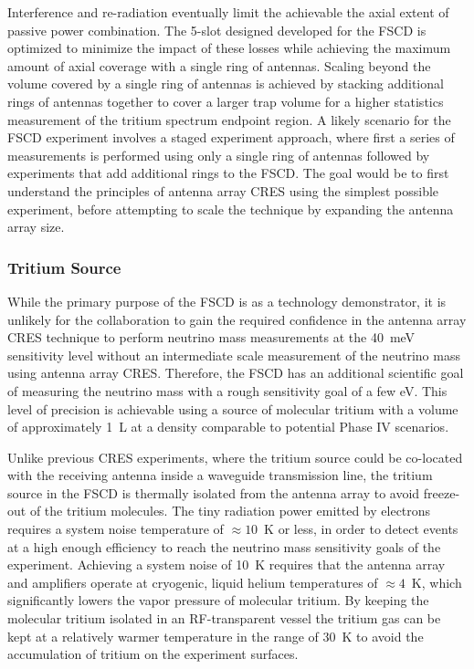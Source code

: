 Interference and re-radiation eventually limit the achievable the axial extent of passive power combination. The 5-slot designed developed for the FSCD is optimized to minimize the impact of these losses while achieving the maximum amount of axial coverage with a single ring of antennas. Scaling beyond the volume covered by a single ring of antennas is achieved by stacking additional rings of antennas together to cover a larger trap volume for a higher statistics measurement of the tritium spectrum endpoint region. A likely scenario for the FSCD experiment involves a staged experiment approach, where first a series of measurements is performed using only a single ring of antennas followed by experiments that add additional rings to the FSCD. The goal would be to first understand the principles of antenna array CRES using the simplest possible experiment, before attempting to scale the technique by expanding the antenna array size. 

\subsubsection*{Tritium Source}

While the primary purpose of the FSCD is as a technology demonstrator, it is unlikely for the collaboration to gain the required confidence in the antenna array CRES technique to perform neutrino mass measurements at the 40~meV sensitivity level without an intermediate scale measurement of the neutrino mass using antenna array CRES. Therefore, the FSCD has an additional scientific goal of measuring the neutrino mass with a rough sensitivity goal of a few eV. This level of precision is achievable using a source of molecular tritium with a volume of approximately 1~L at a density comparable to potential Phase IV scenarios.

Unlike previous CRES experiments, where the tritium source could be co-located with the receiving antenna inside a waveguide transmission line, the tritium source in the FSCD is thermally isolated from the antenna array to avoid freeze-out of the tritium molecules. The tiny radiation power emitted by electrons requires a system noise temperature of $\approx 10$~K or less, in order to detect events at a high enough efficiency to reach the neutrino mass sensitivity goals of the experiment. Achieving a system noise of 10~K requires that the antenna array and amplifiers operate at cryogenic, liquid helium temperatures of $\approx 4$~K, which significantly lowers the vapor pressure of molecular tritium. By keeping the molecular tritium isolated in an RF-transparent vessel the tritium gas can be kept at a relatively warmer temperature in the range of 30~K to avoid the accumulation of tritium on the experiment surfaces. 

